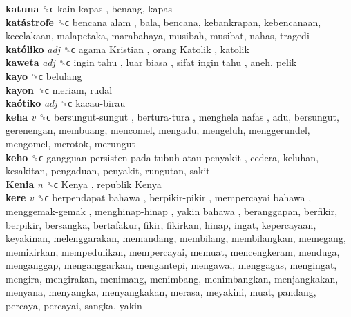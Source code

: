 \textbf{katuna} ␝ϲ   kain kapas , benang, kapas  \\
\textbf{katástrofe} ␝ϲ   bencana alam , bala, bencana, kebankrapan, kebencanaan, kecelakaan, malapetaka, marabahaya, musibah, musibat, nahas, tragedi  \\
\textbf{katóliko} \emph{adj}  ␝ϲ   agama Kristian ,  orang Katolik , katolik  \\
\textbf{kaweta} \emph{adj}  ␝ϲ   ingin tahu ,  luar biasa ,  sifat ingin tahu , aneh, pelik  \\
\textbf{kayo} ␝ϲ  belulang  \\
\textbf{kayon} ␝ϲ  meriam, rudal  \\
\textbf{kaótiko} \emph{adj}  ␝ϲ   kacau-birau   \\
\textbf{keha} \emph{v}  ␝ϲ   bersungut-sungut ,  bertura-tura ,  menghela nafas , adu, bersungut, gerenengan, membuang, mencomel, mengadu, mengeluh, menggerundel, mengomel, merotok, merungut  \\
\textbf{keho} ␝ϲ   gangguan persisten pada tubuh atau penyakit , cedera, keluhan, kesakitan, pengaduan, penyakit, rungutan, sakit  \\
\textbf{Kenia} \emph{n}  ␝ϲ   Kenya ,  republik Kenya   \\
\textbf{kere} \emph{v}  ␝ϲ   berpendapat bahawa ,  berpikir-pikir ,  mempercayai bahawa ,  menggemak-gemak ,  menghinap-hinap ,  yakin bahawa , beranggapan, berfikir, berpikir, bersangka, bertafakur, fikir, fikirkan, hinap, ingat, kepercayaan, keyakinan, melenggarakan, memandang, membilang, membilangkan, memegang, memikirkan, mempedulikan, mempercayai, memuat, mencengkeram, menduga, menganggap, menganggarkan, mengantepi, mengawai, menggagas, mengingat, mengira, mengirakan, menimang, menimbang, menimbangkan, menjangkakan, menyana, menyangka, menyangkakan, merasa, meyakini, muat, pandang, percaya, percayai, sangka, yakin  \\

